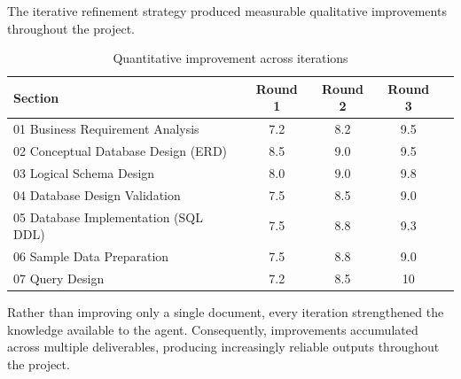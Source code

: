 The iterative refinement strategy produced measurable qualitative improvements throughout the project.

\begin{table}[H]

	\centering

	\caption{Quantitative improvement across iterations}

	\label{tab:progress}

	\begin{tabularx}{\linewidth}{lcccc}

		\toprule

		\textbf{Section}
		 &
		\textbf{Round 1}
		 &
		\textbf{Round 2}
		 &
		\textbf{Round 3}

		\\

		\midrule

		01 Business Requirement Analysis
		 &
		7.2
		 &
		8.2
		 &
		9.5

		\\

		02 Conceptual Database Design (ERD)
		 &
		8.5
		 &
		9.0
		 &
		9.5

		\\

		03 Logical Schema Design
		 &
		8.0
		 &
		9.0
		 &
		9.8

		\\

		04 Database Design Validation
		 &
		7.5
		 &
		8.5
		 &
		9.0

		\\

		05 Database Implementation (SQL DDL)
		 &
		7.5
		 &
		8.8
		 &
		9.3

		\\

		06 Sample Data Preparation
		 &
		7.5
		 &
		8.8
		 &
		9.0

		\\

		07 Query Design
		 &
		7.2
		 &
		8.5
		 &
		10

		\\

		\bottomrule
	\end{tabularx}

\end{table}

Rather than improving only a single document, every iteration strengthened the knowledge available to the agent. Consequently, improvements accumulated across multiple deliverables, producing increasingly reliable outputs throughout the project.

